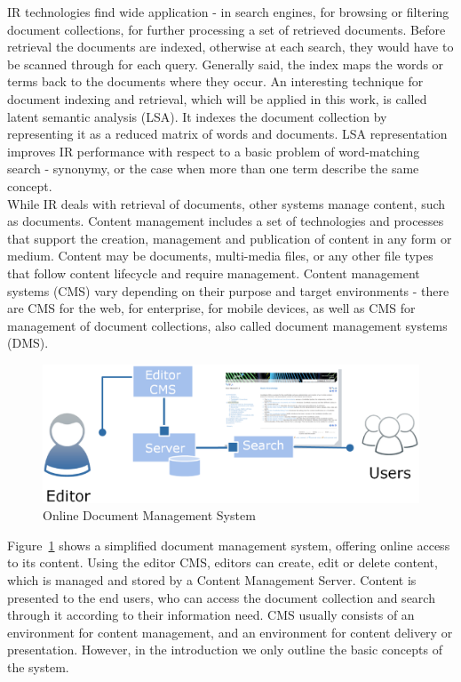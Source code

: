 IR technologies find wide application - in search engines, for browsing or filtering document collections, for further processing a set of retrieved documents. Before retrieval the documents are indexed, otherwise at each search, they would have to be scanned through for each query. Generally said, the index maps the words or terms back to the documents where they occur. An interesting technique for document indexing and retrieval, which will be applied in this work, is called latent semantic analysis (LSA). It indexes the document collection by representing it as a reduced matrix of words and documents. LSA representation improves IR performance with respect to a basic problem of word-matching search - synonymy, or the case when more than one term describe the same concept. \\

While IR deals with retrieval of documents, other systems manage content, such as documents. Content management includes a set of technologies and processes that support the creation, management and publication of content in any form or medium. Content may be documents, multi-media files, or any other file types that follow content lifecycle and require management. Content management systems (CMS) vary depending on their purpose and target environments - there are CMS for the web, for enterprise, for mobile devices, as well as CMS for management of document collections, also called document management systems (DMS). \\

%
%
\begin{figure}[htbp]
	\centering
	\includegraphics[width=\ScaleIfNeeded]{img/cms-simplified} 
	\caption{ Online Document Management System }
	\label{fig:docmachine}
\end{figure}

Figure~\ref{fig:docmachine} shows a simplified document management system, offering online access to its content. Using the editor CMS, editors can create, edit or delete content, which is managed and stored by a Content Management Server. Content is presented to the end users, who can access the document collection and search through it according to their information need. CMS usually consists of an environment for content management, and an environment for content delivery or presentation. However, in the introduction we only outline the basic concepts of the system. \\



